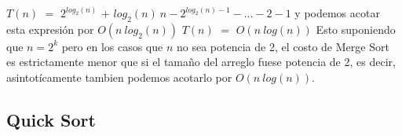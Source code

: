 \documentclass[10pt,a4paper]{article}
\begin{document}
\newline
\newline
\newline
$T(n)$ $=$ $2^{log_{2}(n)}$ $+$ $log_{2}(n)~n - 2^{log_{2}(n)-1} - ... - 2 - 1$ y podemos acotar esta expresión por $O(n~log_{2}(n))$ 
\newline
\newline
\newline
$T(n)$ $=$ $O(n~log(n))$
\newline
\newline
Esto suponiendo que $n = 2^{k}$ pero en los casos que $n$ no sea potencia de 2, el costo de Merge Sort es estrictamente menor que si el tamaño del arreglo fuese potencia de 2, es decir, asintotícamente tambien podemos acotarlo por $O(n~log(n))$. 
\subsection{Quick Sort}
\end{document}
